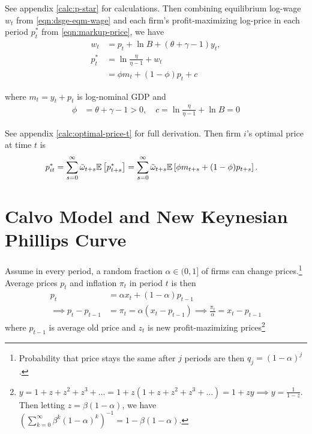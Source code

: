\documentclass[../main.tex]{subfiles}
\begin{document}
        See appendix \eqref{calc:p-star} for calculations. Then combining equilibrium log-wage $w_t$ from \eqref{eqn:dsge-eqm-wage} and each firm's profit-maximizing log-price in each period $p_t^*$ from \eqref{eqn:markup-price}, we have
        \begin{align}
            w_t &= p_t + \ln{B} + (\theta + \gamma - 1) y_t,
            \\
            p_t^* &= \ln{\frac{\eta}{\eta - 1}} + w_t
            \\
            &= \phi m_t + (1-\phi) p_t + c \label{eqn:optimal-price-t}
        \end{align}
        
        where $m_t = y_t + p_t$ is log-nominal GDP and
        \begin{align}
            \phi &= \theta + \gamma - 1 > 0, \quad
            c = \ln{\frac{\eta}{\eta - 1}} + \ln{B} = 0
        \end{align}
        
        See appendix \eqref{calc:optimal-price-t} for full derivation. Then firm $i$'s optimal price at time $t$ is
        \begin{align}
            p_{it}^*
            = \sum_{s=0}^\infty \tilde\omega_{t+s} \mathbb{E}\left[p_{t+s}^*\right]
            &= \sum_{s=0}^\infty \tilde\omega_{t+s} \mathbb{E}\left[\phi m_{t+s} + (1-\phi) p_{t+s}\right].
        \end{align}
        
    \section{Calvo Model and New Keynesian Phillips Curve}
    
        Assume in every period, a random fraction $\alpha \in (0, 1]$ of firms can change prices.\footnote{Probability that price stays the same after $j$ periods are then $q_j = (1-\alpha)^j$.}
        Average prices $p_t$ and inflation $\pi_t$ in period $t$ is then
        \begin{align}
            p_t &= \alpha x_t + (1 - \alpha) p_{t-1}
            \\
            \implies
            p_t - p_{t-1}
            &= \pi_t = \alpha (x_t - p_{t-1})
            \implies
            \frac{\pi_t}{\alpha}
            = x_t - p_{t-1}
        \end{align}
        where $p_{t-1}$ is average old price and $z_t$ is new profit-mazimizing prices\footnote{$y = 1 + z + z^2 + z^3 + ... = 1 + z(1 + z + z^2 + z^3 + ...) = 1 + zy \implies y = \frac{1}{1-z}$. Then letting $z = \beta(1-\alpha)$, we have $\left(\sum_{k=0}^\infty\beta^k(1-\alpha)^k\right)^{-1} = 1-\beta(1-\alpha)$.}
        
\end{document}
